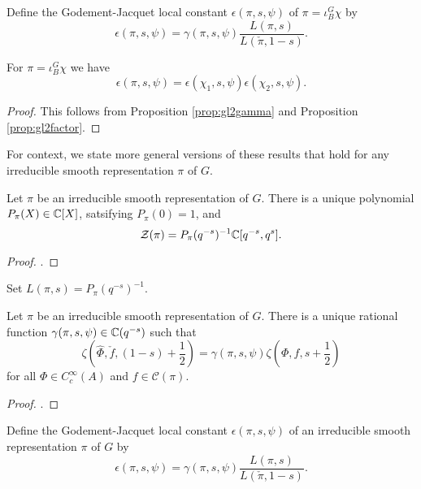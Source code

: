\begin{defn}
    Define the Godement-Jacquet local constant $\epsilon(\pi,s,\psi)$ of $\pi = \iota_B^G \chi$ by 
    $$\epsilon(\pi,s,\psi) = \gamma(\pi,s,\psi) \frac{L(\pi,s)}{L(\check{\pi},1-s)}.$$
\end{defn}

\begin{cor}
    For $\pi= \iota_B^G \chi$ we have
    $$\epsilon(\pi,s,\psi) = \epsilon(\chi_1,s,\psi)\epsilon(\chi_2,s,\psi).$$
\end{cor}
\begin{proof}
    This follows from Proposition \ref{prop:gl2gamma} and Proposition \ref{prop:gl2factor}.
\end{proof}

For context, we state more general versions of these results that hold for any irreducible smooth representation $\pi$ of $G$.

\begin{thm}\label{BHThm1}
    Let $\pi$ be an irreducible smooth representation of $G$. There is a unique polynomial $P_\pi(X) \in \mathbb{C}[X]$, satsifying $P_\pi(0)=1$, and 
    $$\mathcal Z(\pi) = P_\pi(q^{-s})^{-1} \mathbb{C}[q^{-s},q^s].$$
\end{thm}
\begin{proof}
    \cite[Theorem 24.2.1]{BH1}.
\end{proof}

\begin{notn}
    Set $L(\pi,s) = P_\pi(q^{-s})^{-1}$.
\end{notn}

\begin{thm}\label{BHThm2}
    Let $\pi$ be an irreducible smooth representation of $G$. There is a unique rational function $\gamma(\pi,s,\psi) \in \mathbb{C}(q^{-s})$ such that 
    $$\zeta(\hat\Phi,\check{f},(1-s)+\frac{1}{2}) = \gamma(\pi,s,\psi) \zeta(\Phi,f,s+\frac{1}{2})$$ for all $\Phi \in C_c^\infty(A)$ and $f \in \mathcal C(\pi)$.
\end{thm}
\begin{proof}
    \cite[Theorem 24.2.2]{BH1}.
\end{proof}

\begin{defn}
    Define the Godement-Jacquet local constant $\epsilon(\pi,s,\psi)$ of an irreducible smooth representation $\pi$ of $G$ by 
    $$\epsilon(\pi,s,\psi) = \gamma(\pi,s,\psi) \frac{L(\pi,s)}{L(\check{\pi},1-s)}.$$
\end{defn}

